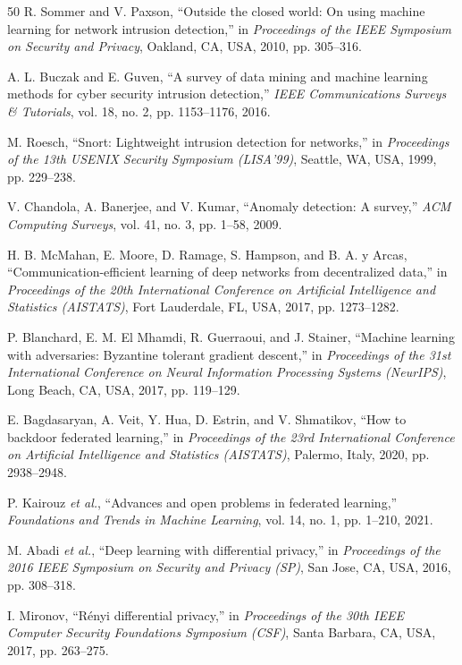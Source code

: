 \documentclass[preprint,12pt]{elsarticle}
\begin{document}
\begin{thebibliography}{50}
R. Sommer and V. Paxson, ``Outside the closed world: On using machine learning for network intrusion detection,'' in \emph{Proceedings of the IEEE Symposium on Security and Privacy}, Oakland, CA, USA, 2010, pp. 305--316.

A. L. Buczak and E. Guven, ``A survey of data mining and machine learning methods for cyber security intrusion detection,'' \emph{IEEE Communications Surveys \& Tutorials}, vol. 18, no. 2, pp. 1153--1176, 2016.

M. Roesch, ``Snort: Lightweight intrusion detection for networks,'' in \emph{Proceedings of the 13th USENIX Security Symposium (LISA'99)}, Seattle, WA, USA, 1999, pp. 229--238.

V. Chandola, A. Banerjee, and V. Kumar, ``Anomaly detection: A survey,'' \emph{ACM Computing Surveys}, vol. 41, no. 3, pp. 1--58, 2009.

H. B. McMahan, E. Moore, D. Ramage, S. Hampson, and B. A. y Arcas, ``Communication-efficient learning of deep networks from decentralized data,'' in \emph{Proceedings of the 20th International Conference on Artificial Intelligence and Statistics (AISTATS)}, Fort Lauderdale, FL, USA, 2017, pp. 1273--1282.

P. Blanchard, E. M. El Mhamdi, R. Guerraoui, and J. Stainer, ``Machine learning with adversaries: Byzantine tolerant gradient descent,'' in \emph{Proceedings of the 31st International Conference on Neural Information Processing Systems (NeurIPS)}, Long Beach, CA, USA, 2017, pp. 119--129.

E. Bagdasaryan, A. Veit, Y. Hua, D. Estrin, and V. Shmatikov, ``How to backdoor federated learning,'' in \emph{Proceedings of the 23rd International Conference on Artificial Intelligence and Statistics (AISTATS)}, Palermo, Italy, 2020, pp. 2938--2948.

P. Kairouz \emph{et al.}, ``Advances and open problems in federated learning,'' \emph{Foundations and Trends in Machine Learning}, vol. 14, no. 1, pp. 1--210, 2021.

M. Abadi \emph{et al.}, ``Deep learning with differential privacy,'' in \emph{Proceedings of the 2016 IEEE Symposium on Security and Privacy (SP)}, San Jose, CA, USA, 2016, pp. 308--318.

I. Mironov, ``R\'enyi differential privacy,'' in \emph{Proceedings of the 30th IEEE Computer Security Foundations Symposium (CSF)}, Santa Barbara, CA, USA, 2017, pp. 263--275.


\end{thebibliography}
\end{document}
